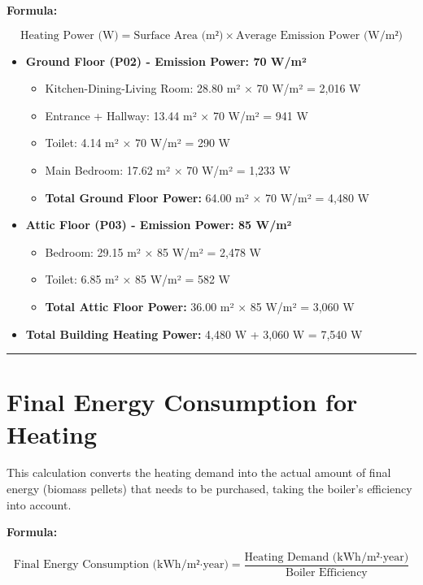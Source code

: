 \documentclass[
  10pt,
  letterpaper,
]{scrbook}
\providecommand{\tightlist}{%
  \setlength{\itemsep}{0pt}\setlength{\parskip}{0pt}}
\begin{document}
\textbf{Formula:}

\[\text{Heating Power (W)} = \text{Surface Area (m²)} \times \text{Average Emission Power (W/m²)}\]

\begin{itemize}
\tightlist
\item
  \textbf{Ground Floor (P02) - Emission Power: 70 W/m²}

  \begin{itemize}
  \tightlist
  \item
    Kitchen-Dining-Living Room: 28.80 m² × 70 W/m² = 2,016 W
  \item
    Entrance + Hallway: 13.44 m² × 70 W/m² = 941 W
  \item
    Toilet: 4.14 m² × 70 W/m² = 290 W
  \item
    Main Bedroom: 17.62 m² × 70 W/m² = 1,233 W
  \item
    \textbf{Total Ground Floor Power:} 64.00 m² × 70 W/m² = 4,480 W
  \end{itemize}
\item
  \textbf{Attic Floor (P03) - Emission Power: 85 W/m²}

  \begin{itemize}
  \tightlist
  \item
    Bedroom: 29.15 m² × 85 W/m² = 2,478 W
  \item
    Toilet: 6.85 m² × 85 W/m² = 582 W
  \item
    \textbf{Total Attic Floor Power:} 36.00 m² × 85 W/m² = 3,060 W
  \end{itemize}
\item
  \textbf{Total Building Heating Power:} 4,480 W + 3,060 W = 7,540 W
\end{itemize}

\begin{center}\rule{0.5\linewidth}{0.5pt}\end{center}

\section{Final Energy Consumption for
Heating}\label{final-energy-consumption-for-heating}

This calculation converts the heating demand into the actual amount of
final energy (biomass pellets) that needs to be purchased, taking the
boiler's efficiency into account.

\textbf{Formula:}

\[\text{Final Energy Consumption (kWh/m²·year)} = \frac{\text{Heating Demand (kWh/m²·year)}}{\text{Boiler Efficiency}}\]
\end{document}
